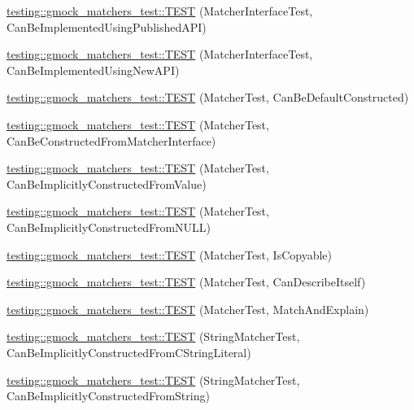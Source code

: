 \begin{DoxyCompactItemize}
\item 
\hyperlink{namespacetesting_1_1gmock__matchers__test_a2d73acaddb6b28a827ce0e475ffc9cde}{testing\+::gmock\+\_\+matchers\+\_\+test\+::\+T\+E\+ST} (Matcher\+Interface\+Test, Can\+Be\+Implemented\+Using\+Published\+A\+PI)
\item 
\hyperlink{namespacetesting_1_1gmock__matchers__test_ad212c5ac3ef7a102a6b1712e40e06a1e}{testing\+::gmock\+\_\+matchers\+\_\+test\+::\+T\+E\+ST} (Matcher\+Interface\+Test, Can\+Be\+Implemented\+Using\+New\+A\+PI)
\item 
\hyperlink{namespacetesting_1_1gmock__matchers__test_a8843a1545b9e09d73b565cf94f2e5f8b}{testing\+::gmock\+\_\+matchers\+\_\+test\+::\+T\+E\+ST} (Matcher\+Test, Can\+Be\+Default\+Constructed)
\item 
\hyperlink{namespacetesting_1_1gmock__matchers__test_a3dee288df7e811f817850a5187c42669}{testing\+::gmock\+\_\+matchers\+\_\+test\+::\+T\+E\+ST} (Matcher\+Test, Can\+Be\+Constructed\+From\+Matcher\+Interface)
\item 
\hyperlink{namespacetesting_1_1gmock__matchers__test_a2bd9ad37a8b9f03b10a15ed322c3249c}{testing\+::gmock\+\_\+matchers\+\_\+test\+::\+T\+E\+ST} (Matcher\+Test, Can\+Be\+Implicitly\+Constructed\+From\+Value)
\item 
\hyperlink{namespacetesting_1_1gmock__matchers__test_a0de94b029c8a13180276e411f4d75f7f}{testing\+::gmock\+\_\+matchers\+\_\+test\+::\+T\+E\+ST} (Matcher\+Test, Can\+Be\+Implicitly\+Constructed\+From\+N\+U\+LL)
\item 
\hyperlink{namespacetesting_1_1gmock__matchers__test_ab37bd0e535503a8f39e34b0554b2fb28}{testing\+::gmock\+\_\+matchers\+\_\+test\+::\+T\+E\+ST} (Matcher\+Test, Is\+Copyable)
\item 
\hyperlink{namespacetesting_1_1gmock__matchers__test_ae85f2ec21822e884ac9ff58741d420d2}{testing\+::gmock\+\_\+matchers\+\_\+test\+::\+T\+E\+ST} (Matcher\+Test, Can\+Describe\+Itself)
\item 
\hyperlink{namespacetesting_1_1gmock__matchers__test_aee6cef32b22ddd6ce8b87578c3de4198}{testing\+::gmock\+\_\+matchers\+\_\+test\+::\+T\+E\+ST} (Matcher\+Test, Match\+And\+Explain)
\item 
\hyperlink{namespacetesting_1_1gmock__matchers__test_a17fb479932a88dc4e334327c5e12c8d6}{testing\+::gmock\+\_\+matchers\+\_\+test\+::\+T\+E\+ST} (String\+Matcher\+Test, Can\+Be\+Implicitly\+Constructed\+From\+C\+String\+Literal)
\item 
\hyperlink{namespacetesting_1_1gmock__matchers__test_a6786eca17f1fc4d6250470cc21ec79f1}{testing\+::gmock\+\_\+matchers\+\_\+test\+::\+T\+E\+ST} (String\+Matcher\+Test, Can\+Be\+Implicitly\+Constructed\+From\+String)

\end{DoxyCompactItemize}
